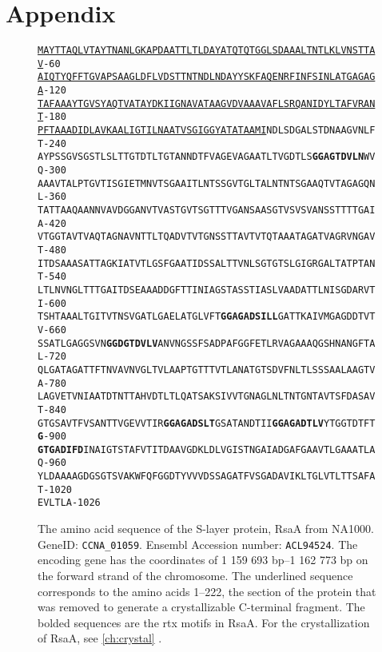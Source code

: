 \chapter{Appendix}
\begin{figure}[htb]
  	\begin{center}
\label{app:rsaseq}
\texttt{\singlespacing\small\underline{MAYTTAQLVTAYTNANLGKAPDAATTLTLDAYATQTQTGGLSDAAALTNTLKLVNSTTAV}\hfill-60~~\\
\underline{AIQTYQFFTGVAPSAAGLDFLVDSTTNTNDLNDAYYSKFAQENRFINFSINLATGAGAGA}\hfill-120~\\
\underline{TAFAAAYTGVSYAQTVATAYDKIIGNAVATAAGVDVAAAVAFLSRQANIDYLTAFVRANT}\hfill-180~\\
\underline{PFTAAADIDLAVKAALIGTILNAATVSGIGGYATATAAMI}NDLSDGALSTDNAAGVNLFT\hfill-240~\\
AYPSSGVSGSTLSLTTGTDTLTGTANNDTFVAGEVAGAATLTVGDTLS\textbf{GGAGTDVLN}WVQ\hfill-300~\\
AAAVTALPTGVTISGIETMNVTSGAAITLNTSSGVTGLTALNTNTSGAAQTVTAGAGQNL\hfill-360~\\
TATTAAQAANNVAVDGGANVTVASTGVTSGTTTVGANSAASGTVSVSVANSSTTTTGAIA\hfill-420~\\
VTGGTAVTVAQTAGNAVNTTLTQADVTVTGNSSTTAVTVTQTAAATAGATVAGRVNGAVT\hfill-480~\\
ITDSAAASATTAGKIATVTLGSFGAATIDSSALTTVNLSGTGTSLGIGRGALTATPTANT\hfill-540~\\
LTLNVNGLTTTGAITDSEAAADDGFTTINIAGSTASSTIASLVAADATTLNISGDARVTI\hfill-600~\\
TSHTAAALTGITVTNSVGATLGAELATGLVFT\textbf{GGAGADSILL}GATTKAIVMGAGDDTVTV\hfill-660~\\
SSATLGAGGSVN\textbf{GGDGTDVLV}ANVNGSSFSADPAFGGFETLRVAGAAAQGSHNANGFTAL\hfill-720~\\
QLGATAGATTFTNVAVNVGLTVLAAPTGTTTVTLANATGTSDVFNLTLSSSAALAAGTVA\hfill-780~\\
LAGVETVNIAATDTNTTAHVDTLTLQATSAKSIVVTGNAGLNLTNTGNTAVTSFDASAVT\hfill-840~\\
GTGSAVTFVSANTTVGEVVTIR\textbf{GGAGADSLT}GSATANDTII\textbf{GGAGADTLV}YTGGTDTFT\textbf{G}\hfill-900~\\
\textbf{GTGADIFD}INAIGTSTAFVTITDAAVGDKLDLVGISTNGAIADGAFGAAVTLGAAATLAQ\hfill-960~\\
YLDAAAAGDGSGTSVAKWFQFGGDTYVVVDSSAGATFVSGADAVIKLTGLVTLTTSAFAT\hfill-1020\\
EVLTLA\hfill-1026}
   	\end{center}
   	\caption[RsaA, amino acid sequence]{
   The amino acid sequence of the \ac{S-layer} protein, RsaA from \caulobacter NA1000. GeneID: \texttt{CCNA\_01059}. Ensembl Accession number: \texttt{ACL94524}. The encoding gene has the coordinates of 1 159 693 bp--1 162 773 bp on the forward strand of the \caulobacter chromosome. The underlined sequence corresponds to the amino acids 1--222, the section of the protein that was removed to generate a crystallizable C-terminal fragment. The bolded sequences are the \ac{rtx} motifs in RsaA. For the crystallization of RsaA, see \cref{ch:crystal} .}
   	

\end{figure}
